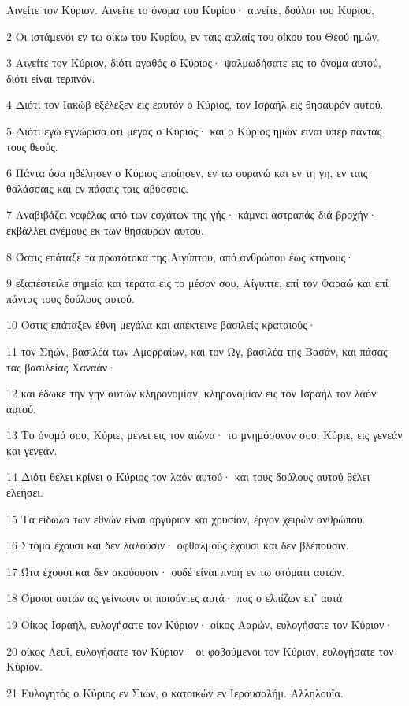 \par Αινείτε τον Κύριον. Αινείτε το όνομα του Κυρίου· αινείτε, δούλοι του Κυρίου,
\par 2 Οι ιστάμενοι εν τω οίκω του Κυρίου, εν ταις αυλαίς του οίκου του Θεού ημών.
\par 3 Αινείτε τον Κύριον, διότι αγαθός ο Κύριος· ψαλμωδήσατε εις το όνομα αυτού, διότι είναι τερπνόν.
\par 4 Διότι τον Ιακώβ εξέλεξεν εις εαυτόν ο Κύριος, τον Ισραήλ εις θησαυρόν αυτού.
\par 5 Διότι εγώ εγνώρισα ότι μέγας ο Κύριος· και ο Κύριος ημών είναι υπέρ πάντας τους θεούς.
\par 6 Πάντα όσα ηθέλησεν ο Κύριος εποίησεν, εν τω ουρανώ και εν τη γη, εν ταις θαλάσσαις και εν πάσαις ταις αβύσσοις.
\par 7 Αναβιβάζει νεφέλας από των εσχάτων της γής· κάμνει αστραπάς διά βροχήν· εκβάλλει ανέμους εκ των θησαυρών αυτού.
\par 8 Όστις επάταξε τα πρωτότοκα της Αιγύπτου, από ανθρώπου έως κτήνους·
\par 9 εξαπέστειλε σημεία και τέρατα εις το μέσον σου, Αίγυπτε, επί τον Φαραώ και επί πάντας τους δούλους αυτού.
\par 10 Όστις επάταξεν έθνη μεγάλα και απέκτεινε βασιλείς κραταιούς·
\par 11 τον Σηών, βασιλέα των Αμορραίων, και τον Ωγ, βασιλέα της Βασάν, και πάσας τας βασιλείας Χαναάν·
\par 12 και έδωκε την γην αυτών κληρονομίαν, κληρονομίαν εις τον Ισραήλ τον λαόν αυτού.
\par 13 Το όνομά σου, Κύριε, μένει εις τον αιώνα· το μνημόσυνόν σου, Κύριε, εις γενεάν και γενεάν.
\par 14 Διότι θέλει κρίνει ο Κύριος τον λαόν αυτού· και τους δούλους αυτού θέλει ελεήσει.
\par 15 Τα είδωλα των εθνών είναι αργύριον και χρυσίον, έργον χειρών ανθρώπου.
\par 16 Στόμα έχουσι και δεν λαλούσιν· οφθαλμούς έχουσι και δεν βλέπουσιν.
\par 17 Ώτα έχουσι και δεν ακούουσιν· ουδέ είναι πνοή εν τω στόματι αυτών.
\par 18 Όμοιοι αυτών ας γείνωσιν οι ποιούντες αυτά· πας ο ελπίζων επ' αυτά
\par 19 Οίκος Ισραήλ, ευλογήσατε τον Κύριον· οίκος Ααρών, ευλογήσατε τον Κύριον·
\par 20 οίκος Λευΐ, ευλογήσατε τον Κύριον· οι φοβούμενοι τον Κύριον, ευλογήσατε τον Κύριον.
\par 21 Ευλογητός ο Κύριος εν Σιών, ο κατοικών εν Ιερουσαλήμ. Αλληλούϊα.


